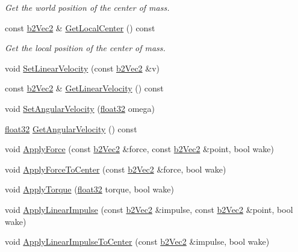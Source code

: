 \begin{DoxyCompactItemize}
\begin{DoxyCompactList}\small\item\em Get the world position of the center of mass. \end{DoxyCompactList}\item 
const \mbox{\hyperlink{structb2_vec2}{b2\+Vec2}} \& \mbox{\hyperlink{classb2_body_a60cc46fc46849b0d5e61a151b7c41269}{Get\+Local\+Center}} () const
\begin{DoxyCompactList}\small\item\em Get the local position of the center of mass. \end{DoxyCompactList}\item 
void \mbox{\hyperlink{classb2_body_a832f3989a44f0d4782c80456832197ad}{Set\+Linear\+Velocity}} (const \mbox{\hyperlink{structb2_vec2}{b2\+Vec2}} \&v)
\item 
const \mbox{\hyperlink{structb2_vec2}{b2\+Vec2}} \& \mbox{\hyperlink{classb2_body_a8fcaf842141320701057f679dff90b89}{Get\+Linear\+Velocity}} () const
\item 
void \mbox{\hyperlink{classb2_body_a37adc4160b84f73e8552a91cbde3f578}{Set\+Angular\+Velocity}} (\mbox{\hyperlink{b2_settings_8h_aacdc525d6f7bddb3ae95d5c311bd06a1}{float32}} omega)
\item 
\mbox{\hyperlink{b2_settings_8h_aacdc525d6f7bddb3ae95d5c311bd06a1}{float32}} \mbox{\hyperlink{classb2_body_a6a404d85efc510f43575f61cb95c07a7}{Get\+Angular\+Velocity}} () const
\item 
void \mbox{\hyperlink{classb2_body_a942be8e1cd2bcd06f53c4638c45a9525}{Apply\+Force}} (const \mbox{\hyperlink{structb2_vec2}{b2\+Vec2}} \&force, const \mbox{\hyperlink{structb2_vec2}{b2\+Vec2}} \&point, bool wake)
\item 
void \mbox{\hyperlink{classb2_body_abeba04911f7a2a141169bb06fe98d06a}{Apply\+Force\+To\+Center}} (const \mbox{\hyperlink{structb2_vec2}{b2\+Vec2}} \&force, bool wake)
\item 
void \mbox{\hyperlink{classb2_body_a54a354447ac3b4cc224c8327a5abc0e8}{Apply\+Torque}} (\mbox{\hyperlink{b2_settings_8h_aacdc525d6f7bddb3ae95d5c311bd06a1}{float32}} torque, bool wake)
\item 
void \mbox{\hyperlink{classb2_body_a7f677e93efb3c4c065087aff317274a3}{Apply\+Linear\+Impulse}} (const \mbox{\hyperlink{structb2_vec2}{b2\+Vec2}} \&impulse, const \mbox{\hyperlink{structb2_vec2}{b2\+Vec2}} \&point, bool wake)
\item 
void \mbox{\hyperlink{classb2_body_afa249d2fc11735985211e47c3d8e16fb}{Apply\+Linear\+Impulse\+To\+Center}} (const \mbox{\hyperlink{structb2_vec2}{b2\+Vec2}} \&impulse, bool wake)

\end{DoxyCompactItemize}
